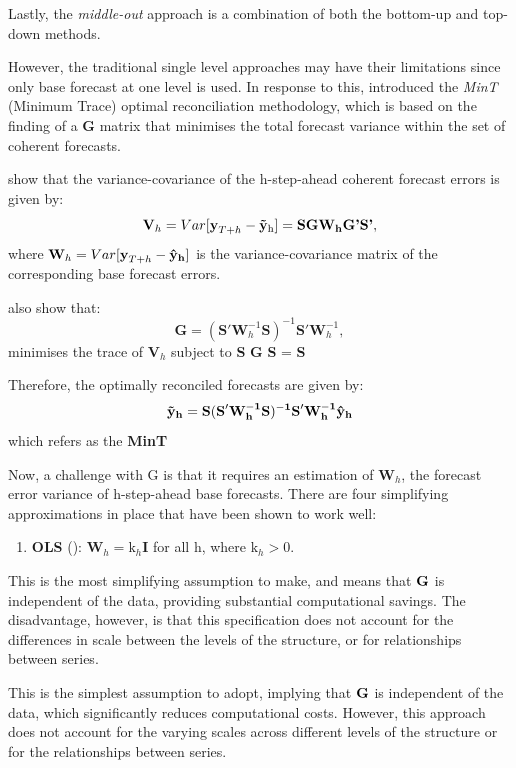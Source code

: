 \documentclass[
  11pt,
  a4paper,
]{article}
\providecommand{\tightlist}{%
  \setlength{\itemsep}{0pt}\setlength{\parskip}{0pt}}\usepackage{longtable,booktabs,array}
\begin{document}
Lastly, the \emph{middle-out} approach is a combination of both the
bottom-up and top-down methods.

However, the traditional single level approaches may have their
limitations since only base forecast at one level is used. In response
to this, \textcite{wickramasuriya2018optimal} introduced the \emph{MinT}
(Minimum Trace) optimal reconciliation methodology, which is based on
the finding of a \textbf{G} matrix that minimises the total forecast
variance within the set of coherent forecasts.

\textcite{wickramasuriya2018optimal} show that the variance-covariance
of the h-step-ahead coherent forecast errors is given by: \[
\textbf{V}_{h} = Var[\textbf{y}_{T+h} - \bf{\tilde{y}}_\text{h}] = \textbf{SG}\textbf{W}_{h}\textbf{G'S'} ,
\] where \(\textbf{W}_{h} = Var[\textbf{y}_{T+h} - \bf{\hat{y}}_{h}]\)
is the variance-covariance matrix of the corresponding base forecast
errors.

\textcite{wickramasuriya2018optimal} also show that: \[
\textbf{G} = (\textbf{S}'\textbf{W}_{h}^{-1}\textbf{S})^{-1}\textbf{S}'\textbf{W}_{h}^{-1},
\] minimises the trace of \(\textbf{V}_{h}\) subject to \textbf{S}
\textbf{G} \textbf{S} = \textbf{S}

Therefore, the optimally reconciled forecasts are given by: \[
\bf{\tilde{y}}_{h} = \textbf{S}(\textbf{S}'\textbf{W}_{h}^{-1}\textbf{S})^{-1}\textbf{S}'\textbf{W}_{h}^{-1}\bf{\hat{y}}_{h}
\] which refers as the \textbf{MinT}

Now, a challenge with G is that it requires an estimation of
\(\textbf{W}_{h}\), the forecast error variance of h-step-ahead base
forecasts. There are four simplifying approximations in place that have
been shown to work well:

\begin{enumerate}
\def\labelenumi{\arabic{enumi}.}
\tightlist
\item
  \textbf{OLS} (\textcite{hyndman2011optimal}):
  \(\mathbf{W}_{h} = \text{k}_{h}\mathbf{I}\) for all h, where
  \(\text{k}_{h} > 0\).
\end{enumerate}

This is the most simplifying assumption to make, and means that
\(\bf{G}\) is independent of the data, providing substantial
computational savings. The disadvantage, however, is that this
specification does not account for the differences in scale between the
levels of the structure, or for relationships between series.

This is the simplest assumption to adopt, implying that \(\bf{G}\) is
independent of the data, which significantly reduces computational
costs. However, this approach does not account for the varying scales
across different levels of the structure or for the relationships
between series.
\end{document}
